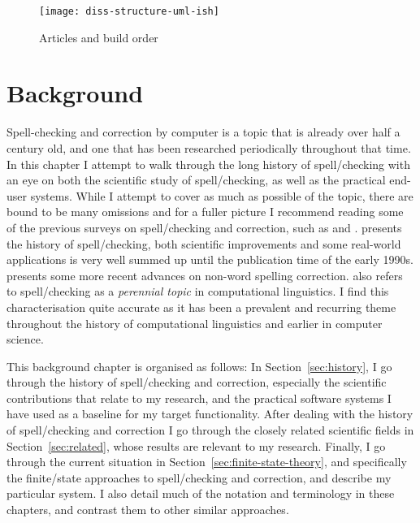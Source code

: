 \documentclass[officiallayout,final]{unihelcompling}
\begin{document}
\begin{figure}
    \texttt{[image: diss-structure-uml-ish]}
    \caption{Articles and build order
    \label{fig:schematic-diagram}}
\end{figure}

\chapter{Background}
\label{chap:background}

Spell-checking and correction by computer is a topic that is already over half
a century old, and one that has been researched periodically throughout that
time.  In this chapter I attempt to walk through the long history of
spell\-/checking with an eye on both the scientific study of spell\-/checking,
as well as the practical end-user systems. While I attempt to cover as much as
possible of the topic, there are bound to be many omissions and for a fuller
picture I recommend reading some of the previous surveys on spell\-/checking
and correction, such as \citet{kukich1992spelling} and
\citet{mitton2009ordering}.  \citet{kukich1992spelling} presents the history of
spell\-/checking, both scientific improvements and some real-world applications
is very well summed up until the publication time of the early 1990s.
\citet{mitton2009ordering} presents some more recent advances on non-word
spelling correction.  \citet{kukich1992spelling} also refers to
spell\-/checking as a \emph{perennial topic} in computational linguistics. I
find this characterisation quite accurate as it has been a prevalent and
recurring theme throughout the history of computational linguistics and earlier
in computer science.

This background chapter is organised as follows: In Section~\ref{sec:history},
I go through the history of spell\-/checking and correction, especially the
scientific contributions that relate to my research, and the practical software
systems I have used as a baseline for my target functionality.  After dealing
with the history of spell\-/checking and correction I go through the closely
related scientific fields in Section~\ref{sec:related}, whose results are
relevant to my research. Finally, I go through the current situation in
Section~\ref{sec:finite-state-theory}, and specifically the finite\-/state
approaches to spell\-/checking and correction, and describe my particular
system. I also detail much of the notation and terminology in these chapters,
and contrast them to other similar approaches.
\end{document}
